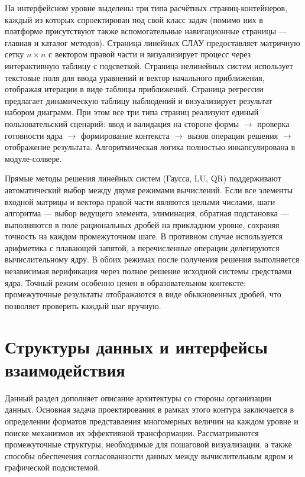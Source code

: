 \documentclass[12pt, oneside]{book}
\begin{document}
    \quad На интерфейсном уровне выделены три типа расчётных страниц-контейнеров, каждый из которых спроектирован под свой класс задач (помимо них в платформе присутствуют также вспомогательные навигационные страницы --- главная и каталог методов). Страница линейных СЛАУ предоставляет матричную сетку $n \times n$ с вектором правой части и визуализирует процесс через интерактивную таблицу с подсветкой. Страница нелинейных систем использует текстовые поля для ввода уравнений и вектор начального приближения, отображая итерации в виде таблицы приближений. Страница регрессии предлагает динамическую таблицу наблюдений и визуализирует результат набором диаграмм. При этом все три типа страниц реализуют единый пользовательский сценарий: ввод и валидация на стороне формы $\rightarrow$ проверка готовности ядра $\rightarrow$ формирование контекста $\rightarrow$ вызов операции решения $\rightarrow$ отображение результата. Алгоритмическая логика полностью инкапсулирована в модуле-солвере.

    \quad Прямые методы решения линейных систем (Гаусса, LU, QR) поддерживают автоматический выбор между двумя режимами вычислений. Если все элементы входной матрицы и вектора правой части являются целыми числами, шаги алгоритма --- выбор ведущего элемента, элиминация, обратная подстановка --- выполняются в поле рациональных дробей на прикладном уровне, сохраняя точность на каждом промежуточном шаге. В противном случае используется арифметика с плавающей запятой, а перечисленные операции делегируются вычислительному ядру. В обоих режимах после получения решения выполняется независимая верификация через полное решение исходной системы средствами ядра. Точный режим особенно ценен в образовательном контексте: промежуточные результаты отображаются в виде обыкновенных дробей, что позволяет проверить каждый шаг вручную.


\section{Структуры данных и интерфейсы взаимодействия}

    \quad Данный раздел дополняет описание архитектуры со стороны организации данных. Основная задача проектирования в рамках этого контура заключается в определении форматов представления многомерных величин на каждом уровне и поиске механизмов их эффективной трансформации. Рассматриваются промежуточные структуры, необходимые для пошаговой визуализации, а также способы обеспечения согласованности данных между вычислительным ядром и графической подсистемой.
\end{document}
